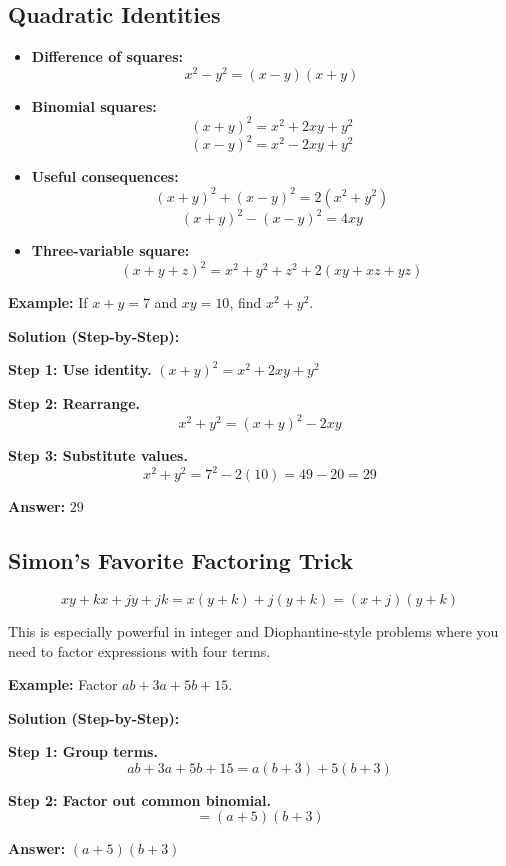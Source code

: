 \documentclass[12pt]{extarticle}
\begin{document}
\subsection*{Quadratic Identities}

\begin{itemize}
\item \textbf{Difference of squares:}
\[
x^2 - y^2 = (x-y)(x+y)
\]

\item \textbf{Binomial squares:}
\[
(x+y)^2 = x^2 + 2xy + y^2
\]
\[
(x-y)^2 = x^2 - 2xy + y^2
\]

\item \textbf{Useful consequences:}
\[
(x+y)^2 + (x-y)^2 = 2(x^2+y^2)
\]
\[
(x+y)^2 - (x-y)^2 = 4xy
\]

\item \textbf{Three-variable square:}
\[
(x+y+z)^2 = x^2+y^2+z^2+2(xy+xz+yz)
\]
\end{itemize}

\begin{examplebox}
\textbf{Example:} If $x+y = 7$ and $xy = 10$, find $x^2+y^2$.

\textbf{Solution (Step-by-Step):}

\textbf{Step 1: Use identity.} $(x+y)^2 = x^2 + 2xy + y^2$

\textbf{Step 2: Rearrange.}
\[
x^2 + y^2 = (x+y)^2 - 2xy
\]

\textbf{Step 3: Substitute values.}
\[
x^2 + y^2 = 7^2 - 2(10) = 49 - 20 = 29
\]

\textbf{Answer:} $\boxed{29}$
\end{examplebox}

\subsection*{Simon's Favorite Factoring Trick}

\begin{conceptbox}[SFFT]
\[
xy + kx + jy + jk = x(y+k) + j(y+k) = (x+j)(y+k)
\]

This is especially powerful in integer and Diophantine-style problems where you need to factor expressions with four terms.
\end{conceptbox}

\begin{examplebox}
\textbf{Example:} Factor $ab + 3a + 5b + 15$.

\textbf{Solution (Step-by-Step):}

\textbf{Step 1: Group terms.}
\[
ab + 3a + 5b + 15 = a(b+3) + 5(b+3)
\]

\textbf{Step 2: Factor out common binomial.}
\[
= (a+5)(b+3)
\]

\textbf{Answer:} $\boxed{(a+5)(b+3)}$
\end{examplebox}
\end{document}
